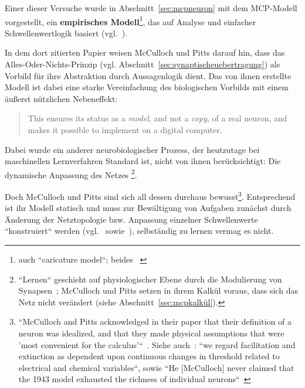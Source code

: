 Einer dieser Versuche wurde in Abschnitt~\ref{sec:mcpneuron} mit dem MCP-Modell vorgestellt, ein \textbf{empirisches Modell}\footnote{
    auch ``caricature model``; beides ~\cite[4]{HI97}
}, das auf Analyse und einfacher Schwellenwertlogik basiert (vgl.~\cite[16]{AR88}).

In dem dort zitierten Papier weisen McCulloch und Pitts darauf hin, dass das Alles-Oder-Nichts-Prinzip ({vgl.} Abschnitt~\ref{sec:synaptischeuebertragung}) als Vorbild für ihre Abstraktion durch Aussagenlogik dient.
Das von ihnen erstellte Modell ist dabei eine starke Vereinfachung des biologischen Vorbilds mit einem äußerst nützlichen Nebeneffekt:

\blockquote[{\cite[43; Hervorhebung i. O.]{BJ90}}]{
    This ensures its status as a \textit{model}, and not a \textit{copy}, of a real neuron, and makes it possible to implement on a digital computer.
}.

Dabei wurde ein anderer neurobiologischer Prozess, der heutzutage bei maschinellen Lernverfahren Standard ist, nicht von ihnen berücksichtigt: Die dynamische Anpassung des Netzes \footnote{
    ``Lernen`` geschieht auf physiologischer Ebene durch die Modulierung von Synapsen~\cite[115]{HS19c}; McCulloch und Pitts setzen in ihrem Kalkül voraus, dass sich das Netz nicht verändert (siehe Abschnitt~\ref{sec:mcpkalkül}).
}.

Doch McCulloch und Pitts sind sich all dessen durchaus bewusst\footnote{
    ``McCulloch and Pitts acknowledged in their paper that their definition of a neuron was idealized, and that they made physical assumptions that were 'most convenient for the calculus'``~\cite[21]{Abr02}. Siehe auch~\cite[101]{MP43}: ``we regard facilitation and extinction as dependent upon continuous changes in threshold related to electrical and chemical variables``, sowie ``He {[McCulloch]} never claimed that the 1943 model exhausted the richness of individual neurons``~\cite[11]{Arb19}
}.
Entsprechend ist ihr Modell statisch und muss zur Bewältigung von Aufgaben zunächst durch Änderung der Netztopologie {bzw.} Anpassung einzelner Schwellenwerte ``konstruiert`` werden (vgl.~\cite[28]{Fau94} sowie~\cite[51]{Roj93}), selbständig zu lernen vermag es nicht.\\


